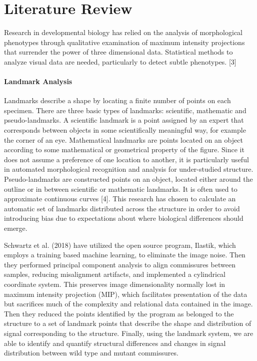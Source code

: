 \documentclass[10pt,letterpaper]{article}
\begin{document}
\section{Literature Review}\label{literature-review}

Research in developmental biology has relied on the analysis of
morphological phenotypes through qualitative examination of maximum
intensity projections that surrender the power of three dimensional
data. Statistical methods to analyze visual data are needed,
particularly to detect subtle phenotypes. {[}3{]}

\paragraph{Landmark Analysis}\label{landmark-analysis}

Landmarks describe a shape by locating a finite number of points on each
specimen. There are three basic types of landmarks: scientific,
mathematic and pseudo-landmarks. A scientific landmark is a point
assigned by an expert that corresponds between objects in some
scientifically meaningful way, for example the corner of an eye.
Mathematical landmarks are points located on an object according to some
mathematical or geometrical property of the figure. Since it does not
assume a preference of one location to another, it is particularly
useful in automated morphological recognition and analysis for
under-studied structure. Pseudo-landmarks are constructed points on an
object, located either around the outline or in between scientific or
mathematic landmarks. It is often used to approximate continuous curves
{[}4{]}. This research has chosen to calculate an automatic set of
landmarks distributed across the structure in order to avoid introducing
bias due to expectations about where biological differences should
emerge.

Schwartz et al. (2018) have utilized the open source program, Ilastik,
which employs a training based machine learning, to eliminate the image
noise. Then they performed principal component analysis to align
commissures between samples, reducing misalignment artifacts, and
implemented a cylindrical coordinate system. This preserves image
dimensionality normally lost in maximum intensity projection (MIP),
which facilitates presentation of the data but sacrifices much of the
complexity and relational data contained in the image. Then they reduced
the points identified by the program as belonged to the structure to a
set of landmark points that describe the shape and distribution of
signal corresponding to the structure. Finally, using the landmark
system, we are able to identify and quantify structural differences and
changes in signal distribution between wild type and mutant commissures.
\end{document}
